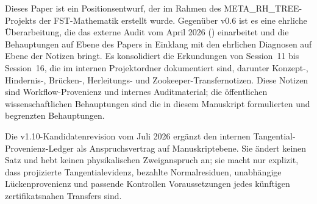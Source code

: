 \documentclass[11pt,a4paper]{article}
\theoremstyle{plain}
\theoremstyle{definition}
\begin{document}
Dieses Paper ist ein Positionsentwurf, der im Rahmen des META\_RH\_TREE-Projekts
der FST-Mathematik erstellt wurde. Gegenüber v0.6 ist es eine ehrliche Überarbeitung,
die das externe Audit vom April 2026
() einarbeitet und die
Behauptungen auf Ebene des Papers in Einklang mit den ehrlichen Diagnosen
auf Ebene der Notizen bringt. Es konsolidiert die Erkundungen von
Session~11 bis Session~16, die im internen Projektordner
 dokumentiert sind, darunter Konzept-, Hindernis-,
Brücken-, Herleitungs- und Zookeeper-Transfernotizen. Diese Notizen sind
Workflow-Provenienz und internes Auditmaterial; die öffentlichen
wissenschaftlichen Behauptungen sind die in diesem Manuskript formulierten
und begrenzten Behauptungen.

Die v1.10-Kandidatenrevision vom Juli 2026 ergänzt den internen
Tangential-Provenienz-Ledger als Anspruchsvertrag auf Manuskriptebene.
Sie ändert keinen Satz und hebt keinen physikalischen Zweiganspruch an;
sie macht nur explizit, dass projizierte Tangentialevidenz, bezahlte
Normalresiduen, unabhängige Lückenprovenienz und passende Kontrollen
Voraussetzungen jedes künftigen zertifikatsnahen Transfers sind.

\begingroup
\sloppy

\endgroup
\end{document}

